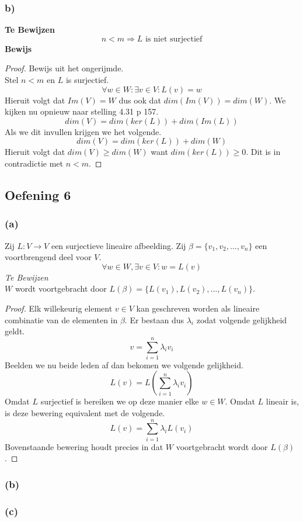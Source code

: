 \documentclass[lineaire_algebra_oplossingen.tex]{subfiles}
\begin{document}
\subsubsection*{b)}
\textbf{Te Bewijzen}
\[
n < m \Rightarrow L \text{ is niet surjectief}
\]
\textbf{Bewijs}
\begin{proof}
Bewijs uit het ongerijmde.\\
Stel $n<m$ en $L$ is surjectief.
\[
\forall w\in W:\exists v\in V: L(v)=w
\]
Hieruit volgt dat $Im(V)=W$ dus ook dat $dim(Im(V))=dim(W)$.
We kijken nu opnieuw naar stelling 4.31 p 157.
\[
dim(V) = dim(ker(L)) + dim(Im(L))
\]
Als we dit invullen krijgen we het volgende.
\[
dim(V) = dim(ker(L)) + dim(W)
\]
Hieruit volgt dat $dim(V) \ge dim(W)$ want $dim(ker(L)) \ge 0$. Dit is in contradictie met $n<m$.
\end{proof}


\subsection{Oefening 6}
\subsubsection*{(a)}
Zij $L: V \rightarrow V$ een surjectieve lineaire afbeelding. Zij $\beta = \{v_1,v_2,...,v_n\}$ een voortbrengend deel voor $V$.
\[
\forall w \in W, \exists v \in V: w=L(v)
\]
\emph{Te Bewijzen}\\
$W$ wordt voortgebracht door $L(\beta) = \{L(v_1),L(v_2),...,L(v_n)\}$.
\begin{proof}
Elk willekeurig element $v\in V$ kan geschreven worden als lineaire combinatie van de elementen in $\beta$. Er bestaan dus $\lambda_i$ zodat volgende gelijkheid geldt.
\[
v = \sum_{i=1}^n\lambda_iv_i
\]
Beelden we nu beide leden af dan bekomen we volgende gelijkheid.
\[
L(v) = L\left(\sum_{i=1}^n\lambda_iv_i\right)
\]
Omdat $L$ surjectief is bereiken we op deze manier elke $w\in W$.
Omdat $L$ lineair is, is deze bewering equivalent met de volgende.
\[
L(v) = \sum_{i=1}^n\lambda_iL(v_i)
\]
Bovenstaande bewering houdt precies in dat $W$ voortgebracht wordt door $L(\beta)$.
\end{proof}

\subsubsection*{(b)}

\subsubsection*{(c)}
\end{document}
